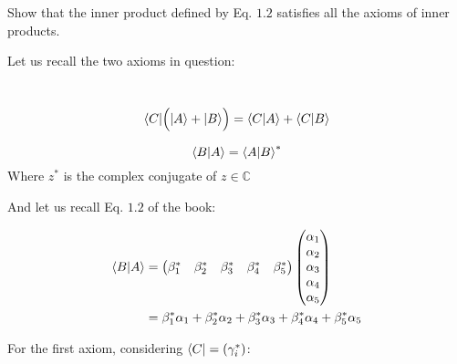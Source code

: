\documentclass[solutions.tex]{subfiles}
\begin{document}
\maketitle
\begin{exercise}
Show that the inner product defined by Eq. $1.2$ satisfies all the
axioms of inner products.
\end{exercise}
\hrr
Let us recall the two axioms in question:
\begin{axiom}\ \\
$$ \langle C| \Big( |A\rangle + |B\rangle \Big) = \left\langle C \middle| A \right\rangle + \left\langle C \middle| B \right\rangle $$
\end{axiom}
\begin{axiom}
$$ \left\langle B \middle| A \right\rangle = \left\langle A \middle| B \right\rangle^{*} $$
Where $z^{*}$ is the complex conjugate of $z\in\mathbb{C}$
\end{axiom}

And let us recall Eq. $1.2$ of the book:

\begin{align*}
	\left\langle B \middle| A \right\rangle &=
		\begin{pmatrix}
			\beta_1^* & \beta_2^* & \beta_3^* & \beta_4^* & \beta_5^* \\
		\end{pmatrix}
		\begin{pmatrix}
			\alpha_1 \\
			\alpha_2 \\
			\alpha_3 \\
			\alpha_4 \\
			\alpha_5 \\
		\end{pmatrix} \\
	~ &= \beta_1^*\alpha_1 + \beta_2^*\alpha_2 + \beta_3^*\alpha_3 +
	\beta_4^*\alpha_4 + \beta_5^*\alpha_5 \\
\end{align*}

For the first axiom, considering $\langle C| = (\gamma_i^*)$:
\end{document}
